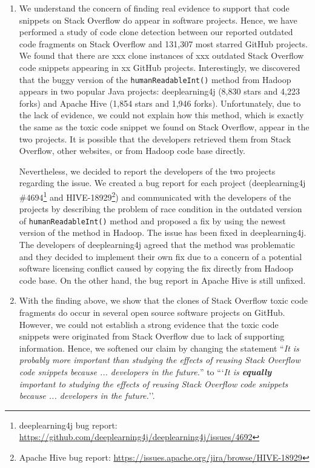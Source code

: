 \documentclass[a4paper,twoside,10pt]{reviewresponse}
\begin{document}
\begin{enumerate}
	\item We understand the concern of finding real evidence to support that code snippets on Stack Overflow do appear in software projects. Hence, we have performed a study of code clone detection between our reported outdated code fragments on Stack Overflow and 131,307 most starred GitHub projects. We found that there are xxx clone instances of xxx outdated Stack Overflow code snippets appearing in xx GitHub projects. Interestingly, we discovered that the buggy version of the \texttt{humanReadableInt()} method from Hadoop appears in two popular Java projects: deeplearning4j (8,830 stars and 4,223 forks) and Apache Hive (1,854 stars and 1,946 forks). Unfortunately, due to the lack of evidence, we could not explain how this method, which is exactly the same as the toxic code snippet we found on Stack Overflow, appear in the two projects. It is possible that the developers retrieved them from Stack Overflow, other websites, or from Hadoop code base directly.  
	
	Nevertheless, we decided to report the developers of the two projects regarding the issue. We created a bug report for each project (deeplearning4j \#4694\footnote{deeplearning4j bug report: \url{https://github.com/deeplearning4j/deeplearning4j/issues/4692}} and HIVE-18929\footnote{Apache Hive bug report: \url{ https://issues.apache.org/jira/browse/HIVE-18929}}) and communicated with the developers of the projects by describing the problem of race condition in the outdated version of \texttt{humanReadableInt()} method and proposed a fix by using the newest version of the method in Hadoop. The issue has been fixed in deeplearning4j. The developers of deeplearning4j agreed that the method was problematic and they decided to implement their own fix due to a concern of a potential software licensing conflict caused by copying the fix directly from Hadoop code base. On the other hand, the bug report in Apache Hive is still unfixed.
	\item With the finding above, we show that the clones of Stack Overflow toxic code fragments do occur in several open source software projects on GitHub. However, we could not establish a strong evidence that the toxic code snippets were originated from Stack Overflow due to lack of supporting information. Hence, we softened our claim by changing the statement ``\textit{It is probably more important than studying the effects of reusing Stack Overflow code snippets because ... developers in the future.}'' to ```\textit{It is \textbf{equally} important to studying the effects of reusing Stack Overflow code snippets because ... developers in the future.}''.
\end{enumerate}
\end{document}
